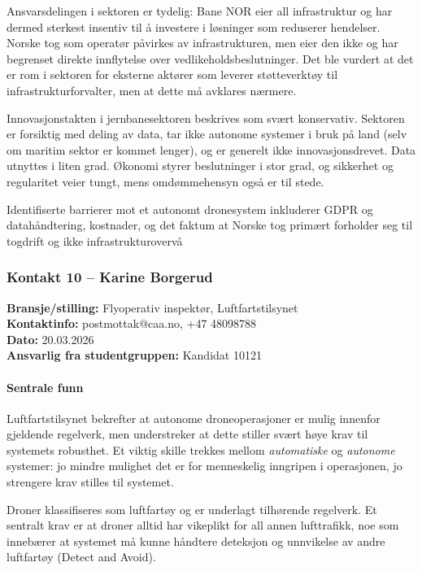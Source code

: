 Ansvarsdelingen i sektoren er tydelig: Bane NOR eier all infrastruktur og har dermed sterkest insentiv til å investere i løsninger som reduserer hendelser. Norske tog som operatør påvirkes av infrastrukturen, men eier den ikke og har begrenset direkte innflytelse over vedlikeholdsbeslutninger. Det ble vurdert at det er rom i sektoren for eksterne aktører som leverer støtteverktøy til infrastrukturforvalter, men at dette må avklares nærmere.

Innovasjonstakten i jernbanesektoren beskrives som svært konservativ. Sektoren er forsiktig med deling av data, tar ikke autonome systemer i bruk på land (selv om maritim sektor er kommet lenger), og er generelt ikke innovasjonsdrevet. Data utnyttes i liten grad. Økonomi styrer beslutninger i stor grad, og sikkerhet og regularitet veier tungt, mens omdømmehensyn også er til stede.

Identifiserte barrierer mot et autonomt dronesystem inkluderer GDPR og datahåndtering, kostnader, og det faktum at Norske tog primært forholder seg til togdrift og ikke infrastrukturovervå

\subsubsection{Kontakt 10 – Karine Borgerud}
\label{kontakt:borgerud}

\textbf{Bransje/stilling:} Flyoperativ inspektør, Luftfartstilsynet \\
\textbf{Kontaktinfo:} postmottak@caa.no, +47 48098788 \\
\textbf{Dato:} 20.03.2026 \\
\textbf{Ansvarlig fra studentgruppen:}  Kandidat 10121

\paragraph{Sentrale funn}

Luftfartstilsynet bekrefter at autonome droneoperasjoner er mulig innenfor gjeldende regelverk, men understreker at dette stiller svært høye krav til systemets robusthet. Et viktig skille trekkes mellom \textit{automatiske} og \textit{autonome} systemer: jo mindre mulighet det er for menneskelig inngripen i operasjonen, jo strengere krav stilles til systemet.

Droner klassifiseres som luftfartøy og er underlagt tilhørende regelverk. Et sentralt krav er at droner alltid har vikeplikt for all annen lufttrafikk, noe som innebærer at systemet må kunne håndtere deteksjon og unnvikelse av andre luftfartøy (Detect and Avoid).

